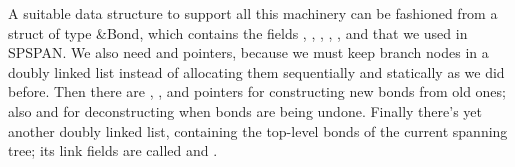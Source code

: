 A suitable data structure to support all this machinery can be
fashioned from a struct of type \&{Bond}, which contains the fields
, , , , , and %
 that we used in
{\mc SPSPAN}. We also need  and  pointers, because
we
must keep branch nodes in a doubly linked list instead of allocating
them sequentially and statically as we did before. Then there are ,
, and  pointers for constructing new bonds from old
ones;
also  and  for deconstructing when bonds are being
undone.
Finally there's yet another doubly linked list, containing the top-level
bonds of the current spanning tree; its link fields are called  and %
.

